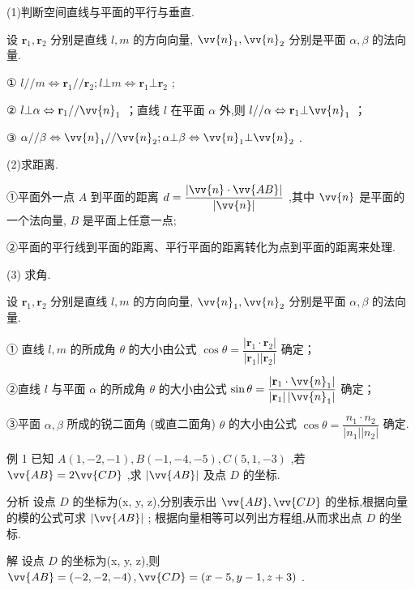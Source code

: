 (1)判断空间直线与平面的平行与垂直.

设 ${\mathbf{r}}_{1},{\mathbf{r}}_{2}$ 分别是直线 $l,m$ 的方向向量, ${\vv{n}}_{1},{\vv{n}}_{2}$ 分别是平面 $\alpha ,\beta$ 的法向量.

① $l//m \Leftrightarrow  {\mathbf{r}}_{1}//{\mathbf{r}}_{2};l \bot  m \Leftrightarrow  {\mathbf{r}}_{1} \bot  {\mathbf{r}}_{2}$ ;

② $l \bot  \alpha  \Leftrightarrow  {\mathbf{r}}_{1}//{\vv{n}}_{1}$ ；直线 $l$ 在平面 $\alpha$ 外,则 $l//\alpha  \Leftrightarrow  {\mathbf{r}}_{1} \bot  {\vv{n}}_{1}$ ；

③ $\alpha //\beta  \Leftrightarrow  {\vv{n}}_{1}//{\vv{n}}_{2};\alpha  \bot  \beta  \Leftrightarrow  {\vv{n}}_{1} \bot  {\vv{n}}_{2}$ .

(2)求距离.

①平面外一点 $A$ 到平面的距离 $d = \dfrac{\left| \vv{n} \cdot  \vv{AB}\right| }{\left| \vv{n}\right| }$ ,其中 $\vv{n}$ 是平面的一个法向量, $B$ 是平面上任意一点;

②平面的平行线到平面的距离、平行平面的距离转化为点到平面的距离来处理.

(3) 求角.

设 ${\mathbf{r}}_{1},{\mathbf{r}}_{2}$ 分别是直线 $l,m$ 的方向向量, ${\vv{n}}_{1},{\vv{n}}_{2}$ 分别是平面 $\alpha ,\beta$ 的法向量.

① 直线 $l,m$ 的所成角 $\theta$ 的大小由公式 $\cos \theta  = \dfrac{\left| {\mathbf{r}}_{1} \cdot  {\mathbf{r}}_{2}\right| }{\left| {\mathbf{r}}_{1}\right| \left| {\mathbf{r}}_{2}\right| }$ 确定；

②直线 $l$ 与平面 $\alpha$ 的所成角 $\theta$ 的大小由公式 $\sin \theta  = \dfrac{\left| {\mathbf{r}}_{1} \cdot  {\vv{n}}_{1}\right| }{\left| {\mathbf{r}}_{1}\right| \left| {\vv{n}}_{1}\right| }$ 确定；

③平面 $\alpha ,\beta$ 所成的锐二面角 (或直二面角) $\theta$ 的大小由公式 $\cos \theta  = \dfrac{{n}_{1} \cdot  {n}_{2}}{\left| {n}_{1}\right| \left| {n}_{2}\right| }$ 确定.

例 1 已知 $A\left( {1, - 2, - 1}\right) ,B\left( {-1, - 4, - 5}\right) ,C\left( {5,1, - 3}\right)$ ,若 $\vv{AB} = 2\vv{CD}$ ,求 $\left| \vv{AB}\right|$ 及点 $D$ 的坐标.

分析 设点 $D$ 的坐标为(x, y, z),分别表示出 $\vv{AB},\vv{CD}$ 的坐标,根据向量的模的公式可求 $\left| \vv{AB}\right|$ ; 根据向量相等可以列出方程组,从而求出点 $D$ 的坐标.

解 设点 $D$ 的坐标为(x, y, z),则 $\vv{AB} = \left( {-2, - 2, - 4}\right) ,\vv{CD} = \left( {x - 5,y - 1,z + 3}\right)$ .


